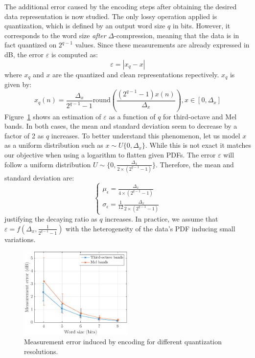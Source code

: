 \documentclass[sensors,article,submit,moreauthors,pdftex,10pt,a4paper]{mdpi}
\begin{document}
The additional error caused by the encoding steps after obtaining the desired data representation is now studied. The only lossy operation applied is quantization, which is defined by an output word size $q$ in bits. However, it corresponds to the word size \textit{after} $\Delta$-compression, meaning that the data is in fact quantized on $2^{q-1}$ values. Since these measurements are already expressed in dB, the error $\varepsilon$ is computed as:
\begin{equation*}
	\varepsilon = |x_q-x|
\end{equation*}
where $x_q$ and $x$ are the quantized and clean representations repectively. $x_q$ is given by:
\begin{equation*}
x_q(n) = \frac{\Delta_x}{2^{q-1}-1}\textrm{round}\left(\frac{(2^{q-1}-1)x(n)}{\Delta_x}\right), x\in \left[0, \Delta_x\right]
\end{equation*}
Figure~\ref{fig:error_q} shows an estimation of $\varepsilon$ as a function of $q$ for third-octave and Mel bands. In both cases, the mean and standard deviation seem to decrease by a factor of 2 as $q$ increases. To better understand this phenomenon, let us model $x$ as a uniform distribution such as $x\sim \textit{U}\{0, \Delta_x\}$. While this is not exact it matches our objective when using a logarithm to flatten given PDFs. The error $\varepsilon$ will follow a uniform distribution $U\sim \{0, \frac{\Delta_x}{2\times (2^{q-1}-1)}\}$. Therefore, the mean and standard deviation are:
\[
\begin{cases}
	\mu_\epsilon = \frac{\Delta_x}{4\times (2^{q-1}-1)}\\
	\sigma_\epsilon = \frac{1}{12}\frac{\Delta_x}{2\times (2^{q-1}-1)}
\end{cases}
\]
justifying the decaying ratio as $q$ increases. In practice, we assume that $\varepsilon = f(\Delta_x, \frac{1}{2^{q-1}-1})$ with the heterogeneity of the data's PDF inducing small variations.

\begin{figure}[htbp]
	\centering
		\includegraphics[width=0.5\textwidth]{figures/error_qall.eps}
	\caption{Measurement error induced by encoding for different quantization resolutions.}
	\label{fig:error_q}
\end{figure}
\end{document}
